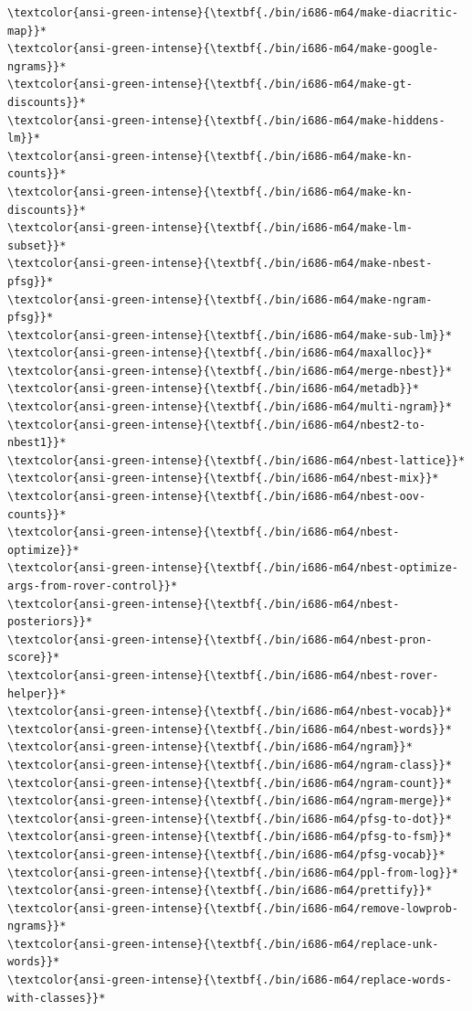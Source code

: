 \documentclass[11pt]{article}
\begin{document}
\begin{Verbatim}[commandchars=\\\{\}]
\textcolor{ansi-green-intense}{\textbf{./bin/i686-m64/make-diacritic-map}}*
\textcolor{ansi-green-intense}{\textbf{./bin/i686-m64/make-google-ngrams}}*
\textcolor{ansi-green-intense}{\textbf{./bin/i686-m64/make-gt-discounts}}*
\textcolor{ansi-green-intense}{\textbf{./bin/i686-m64/make-hiddens-lm}}*
\textcolor{ansi-green-intense}{\textbf{./bin/i686-m64/make-kn-counts}}*
\textcolor{ansi-green-intense}{\textbf{./bin/i686-m64/make-kn-discounts}}*
\textcolor{ansi-green-intense}{\textbf{./bin/i686-m64/make-lm-subset}}*
\textcolor{ansi-green-intense}{\textbf{./bin/i686-m64/make-nbest-pfsg}}*
\textcolor{ansi-green-intense}{\textbf{./bin/i686-m64/make-ngram-pfsg}}*
\textcolor{ansi-green-intense}{\textbf{./bin/i686-m64/make-sub-lm}}*
\textcolor{ansi-green-intense}{\textbf{./bin/i686-m64/maxalloc}}*
\textcolor{ansi-green-intense}{\textbf{./bin/i686-m64/merge-nbest}}*
\textcolor{ansi-green-intense}{\textbf{./bin/i686-m64/metadb}}*
\textcolor{ansi-green-intense}{\textbf{./bin/i686-m64/multi-ngram}}*
\textcolor{ansi-green-intense}{\textbf{./bin/i686-m64/nbest2-to-nbest1}}*
\textcolor{ansi-green-intense}{\textbf{./bin/i686-m64/nbest-lattice}}*
\textcolor{ansi-green-intense}{\textbf{./bin/i686-m64/nbest-mix}}*
\textcolor{ansi-green-intense}{\textbf{./bin/i686-m64/nbest-oov-counts}}*
\textcolor{ansi-green-intense}{\textbf{./bin/i686-m64/nbest-optimize}}*
\textcolor{ansi-green-intense}{\textbf{./bin/i686-m64/nbest-optimize-args-from-rover-control}}*
\textcolor{ansi-green-intense}{\textbf{./bin/i686-m64/nbest-posteriors}}*
\textcolor{ansi-green-intense}{\textbf{./bin/i686-m64/nbest-pron-score}}*
\textcolor{ansi-green-intense}{\textbf{./bin/i686-m64/nbest-rover-helper}}*
\textcolor{ansi-green-intense}{\textbf{./bin/i686-m64/nbest-vocab}}*
\textcolor{ansi-green-intense}{\textbf{./bin/i686-m64/nbest-words}}*
\textcolor{ansi-green-intense}{\textbf{./bin/i686-m64/ngram}}*
\textcolor{ansi-green-intense}{\textbf{./bin/i686-m64/ngram-class}}*
\textcolor{ansi-green-intense}{\textbf{./bin/i686-m64/ngram-count}}*
\textcolor{ansi-green-intense}{\textbf{./bin/i686-m64/ngram-merge}}*
\textcolor{ansi-green-intense}{\textbf{./bin/i686-m64/pfsg-to-dot}}*
\textcolor{ansi-green-intense}{\textbf{./bin/i686-m64/pfsg-to-fsm}}*
\textcolor{ansi-green-intense}{\textbf{./bin/i686-m64/pfsg-vocab}}*
\textcolor{ansi-green-intense}{\textbf{./bin/i686-m64/ppl-from-log}}*
\textcolor{ansi-green-intense}{\textbf{./bin/i686-m64/prettify}}*
\textcolor{ansi-green-intense}{\textbf{./bin/i686-m64/remove-lowprob-ngrams}}*
\textcolor{ansi-green-intense}{\textbf{./bin/i686-m64/replace-unk-words}}*
\textcolor{ansi-green-intense}{\textbf{./bin/i686-m64/replace-words-with-classes}}*

\end{Verbatim}
\end{document}
